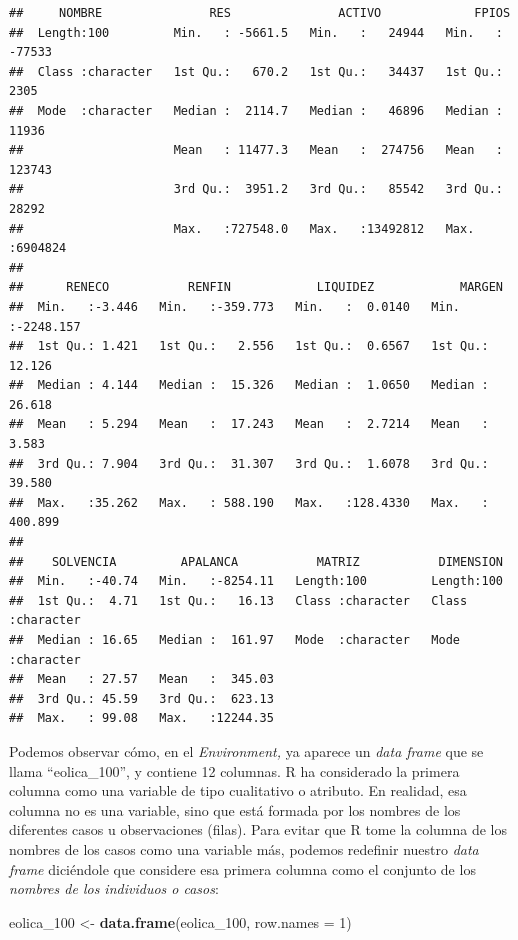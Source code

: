 \documentclass[
]{book}
\newenvironment{Shaded}{\begin{snugshade}}{\end{snugshade}}
\newcommand{\AttributeTok}[1]{\textcolor[rgb]{0.13,0.29,0.53}{#1}}
\newcommand{\DecValTok}[1]{\textcolor[rgb]{0.00,0.00,0.81}{#1}}
\newcommand{\FunctionTok}[1]{\textcolor[rgb]{0.13,0.29,0.53}{\textbf{#1}}}
\newcommand{\NormalTok}[1]{#1}
\newcommand{\OtherTok}[1]{\textcolor[rgb]{0.56,0.35,0.01}{#1}}
\begin{document}
\begin{verbatim}
##     NOMBRE               RES               ACTIVO             FPIOS        
##  Length:100         Min.   : -5661.5   Min.   :   24944   Min.   : -77533  
##  Class :character   1st Qu.:   670.2   1st Qu.:   34437   1st Qu.:   2305  
##  Mode  :character   Median :  2114.7   Median :   46896   Median :  11936  
##                     Mean   : 11477.3   Mean   :  274756   Mean   : 123743  
##                     3rd Qu.:  3951.2   3rd Qu.:   85542   3rd Qu.:  28292  
##                     Max.   :727548.0   Max.   :13492812   Max.   :6904824  
## 
##      RENECO           RENFIN            LIQUIDEZ            MARGEN         
##  Min.   :-3.446   Min.   :-359.773   Min.   :  0.0140   Min.   :-2248.157  
##  1st Qu.: 1.421   1st Qu.:   2.556   1st Qu.:  0.6567   1st Qu.:   12.126  
##  Median : 4.144   Median :  15.326   Median :  1.0650   Median :   26.618  
##  Mean   : 5.294   Mean   :  17.243   Mean   :  2.7214   Mean   :    3.583  
##  3rd Qu.: 7.904   3rd Qu.:  31.307   3rd Qu.:  1.6078   3rd Qu.:   39.580  
##  Max.   :35.262   Max.   : 588.190   Max.   :128.4330   Max.   :  400.899  
## 
##    SOLVENCIA         APALANCA           MATRIZ           DIMENSION        
##  Min.   :-40.74   Min.   :-8254.11   Length:100         Length:100        
##  1st Qu.:  4.71   1st Qu.:   16.13   Class :character   Class :character  
##  Median : 16.65   Median :  161.97   Mode  :character   Mode  :character  
##  Mean   : 27.57   Mean   :  345.03                                        
##  3rd Qu.: 45.59   3rd Qu.:  623.13                                        
##  Max.   : 99.08   Max.   :12244.35
\end{verbatim}

Podemos observar cómo, en el \emph{Environment,} ya aparece un \emph{data frame} que se llama ``eolica\_100'', y contiene 12 columnas. R ha considerado la primera columna como una variable de tipo cualitativo o atributo. En realidad, esa columna no es una variable, sino que está formada por los nombres de los diferentes casos u observaciones (filas). Para evitar que R tome la columna de los nombres de los casos como una variable más, podemos redefinir nuestro \emph{data frame} diciéndole que considere esa primera columna como el conjunto de los \emph{nombres de los individuos o casos}:

\begin{Shaded}
\begin{Highlighting}[]
\NormalTok{eolica\_100 }\OtherTok{\textless{}{-}} \FunctionTok{data.frame}\NormalTok{(eolica\_100, }\AttributeTok{row.names =} \DecValTok{1}\NormalTok{)}
\end{Highlighting}
\end{Shaded}
\end{document}
